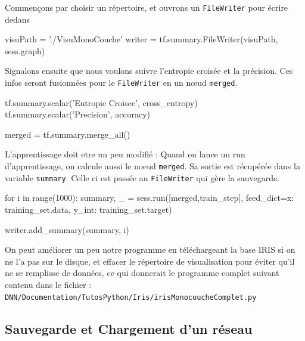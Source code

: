 \documentclass[a4paper,11pt]{book}
\begin{document}
Commençons par choisir un répertoire, et ouvrons un \verb+FileWriter+ pour écrire dedans
\begin{mypython}
visuPath = './VisuMonoCouche'
writer = tf.summary.FileWriter(visuPath, sess.graph)
\end{mypython}

Signalons ensuite que nous voulons suivre l'entropie croisée et la précision. Ces infos seront fusionnées pour le \verb+FileWriter+ en un nœud \verb+merged+.
\begin{mypython}
tf.summary.scalar('Entropie Croisee', cross_entropy)
tf.summary.scalar('Precision', accuracy)

merged = tf.summary.merge_all()
\end{mypython}

L'apprentissage doit etre un peu modifié : Quand on lance un run d'apprentissage, on calcule aussi le noeud \verb+merged+. Sa sortie est récupérée dans la variable \verb+summary+. Celle ci est passée au \verb+FileWriter+ qui gère la sauvegarde.
\begin{mypython}
for i in range(1000):
  summary, _ = sess.run([merged,train_step], feed_dict={x: training_set.data, y_int: training_set.target})

  writer.add_summary(summary, i)
\end{mypython}

On peut améliorer un peu notre programme en téléchargeant la base IRIS si on ne l'a pas sur le disque, et effacer le répertoire de visualisation pour éviter qu'il ne se remplisse de données, ce qui donnerait le programme complet suivant contenu dans le fichier :\\
\verb+DNN/Documentation/TutosPython/Iris/irisMonocoucheComplet.py+



\subsection{Sauvegarde et Chargement d'un réseau }
\end{document}

